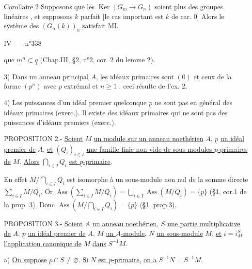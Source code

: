 
\uline{Corollaire 2} Supposons que les $\operatorname{Ker}(G_m\rightarrow G_n)$  soient \deleted{$=$} plus des groupes  linéaires ,  et supposons $k$ parfait [le cas important est $k$ de car. 0] Alors le système des $(G_n(k))_n$ satisfait ML



IV --  -- \hfill n°338

que $\underline m^n\subset\underline q$ (Chap.III, §2, n°2, cor. 2 du lemme 2).

3) Dans un anneau \uline{principal} $A$, les idéaux primaires sont $(0)$ et ceux de la forme $(p^n)$ avec $p$ extrémal et $n\geq1$ : ceci résulte de l'ex. 2.

4) Les puissances d'un idéal premier quelconque $\underline p$ ne sont pas en général des idéaux primaires (exerc.\quad). Il existe des idéaux primaires qui ne sont pas des puissances d'idéaux premiers (exerc.\quad).


PROPOSITION 2.- \uline{Soient} $M$ \uline{un module sur un anneau noethérien} $A$, $\underline p$ \uline{un idéal premier de} $A$, \uline{et} $(Q_i)_{i\in I}$ \uline{une famille finie non vide de sous-modules $\underline p$-primaires de} $M$. \uline{Alors} $\bigcap_{i\in I}Q_i$ \uline{est $\underline p$-primaire}.

En effet $M/\bigcap_{i\in I}Q_i$ est isomorphe à un sous-module non nul de la somme directe $\sum_{i\in I}M/Q_i$. Or $\operatorname{Ass}(\sum_{i\in I}M/Q_i)=\bigcup_{i\in I}\operatorname{Ass}(M/Q_i)=\{\underline p\}$ (§1, cor.1 de la prop. 3). Donc $\operatorname{Ass}(M/\bigcap_{i\in I}Q_i)=\{\underline p\}$ (§1, prop.3).

PROPOSITION 3.- \uline{Soient} $A$ \uline{un anneau noethérien}, $S$ \uline{une partie multiplicative de} $A$, $\underline p$ \uline{un idéal premier de} $A$, $M$ \uline{un $A$-module}, $N$ \uline{un sous-module} $M$, \uline{et} $i=i_M^S$ \uline{l'application canonique de} $M$ \uline{dans} $S^{-1}M$.

a) \uline{On suppose} $\underline p\cap S\neq\varnothing$. \uline{Si} $N$ \uline{est $\underline p$-primaire}, \uline{on a} $S^{-1}N=S^{-1}M$.

